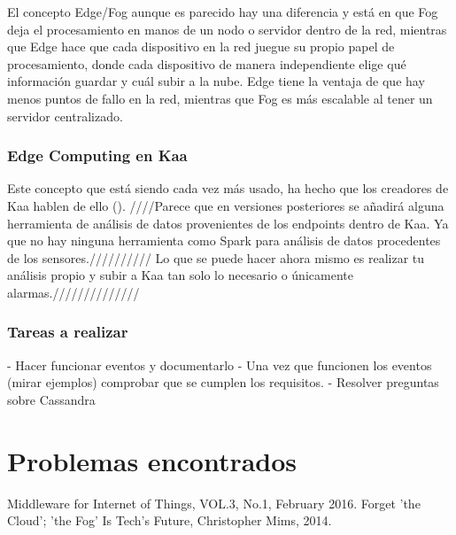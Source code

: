 \documentclass[12pt, twoside]{book}
\newcommand{\MYhref}[3][blue]{\href{#2}{\color{#1}{#3}}}
\begin{document}
El concepto Edge/Fog aunque es parecido hay una diferencia y está en que Fog deja el procesamiento en manos de un nodo o servidor dentro de la red, mientras que Edge hace que cada dispositivo en la red juegue su propio papel de procesamiento, donde cada dispositivo de manera independiente elige qué información guardar y cuál subir a la nube. Edge tiene la ventaja de que hay menos puntos de fallo en la red, mientras que Fog es más escalable al tener un servidor centralizado.

\subsubsection*{Edge Computing en Kaa}
Este concepto que está siendo cada vez más usado, ha hecho que los creadores de Kaa hablen de ello (\MYhref{https://www.kaaproject.org/edge-analytics-kaa/}{vídeo}). ////Parece que en versiones posteriores se añadirá alguna herramienta de análisis de datos provenientes de los endpoints dentro de Kaa. Ya que no hay ninguna herramienta como Spark para análisis de datos procedentes de los sensores.////////// Lo que se puede hacer ahora mismo es realizar tu análisis propio y subir a Kaa tan solo lo necesario o únicamente alarmas.//////////////
\subsubsection*{Tareas a realizar}
- Hacer funcionar eventos y documentarlo
- Una vez que funcionen los eventos (mirar ejemplos) comprobar que se cumplen los requisitos.
- Resolver preguntas sobre Cassandra
\section{Problemas encontrados}


\begin{thebibliography}{X}
 {Middleware for Internet of Things, VOL.3, No.1, February 2016.}
 {Forget 'the Cloud'; 'the Fog' Is Tech's Future, Christopher Mims, 2014.}
\bibitem{}
\bibitem{}
\bibitem{}
\end{thebibliography}
\end{document}

